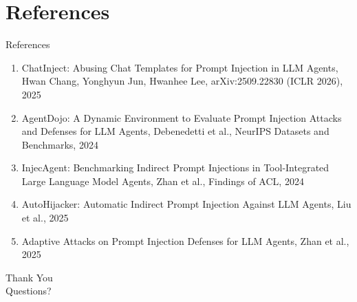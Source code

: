 \documentclass[10pt]{beamer}
\begin{document}
\section{References}
\begin{frame}[allowframebreaks]{References}
  \footnotesize
  \begin{enumerate}
    \item ChatInject: Abusing Chat Templates for Prompt Injection in LLM Agents, Hwan Chang, Yonghyun Jun, Hwanhee Lee, arXiv:2509.22830 (ICLR 2026), 2025
    \item AgentDojo: A Dynamic Environment to Evaluate Prompt Injection Attacks and Defenses for LLM Agents, Debenedetti et al., NeurIPS Datasets and Benchmarks, 2024
    \item InjecAgent: Benchmarking Indirect Prompt Injections in Tool-Integrated Large Language Model Agents, Zhan et al., Findings of ACL, 2024
    \item AutoHijacker: Automatic Indirect Prompt Injection Against LLM Agents, Liu et al., 2025
    \item Adaptive Attacks on Prompt Injection Defenses for LLM Agents, Zhan et al., 2025
  \end{enumerate}
\end{frame}

\begin{frame}[plain]
  \begin{center}
    {\Huge Thank You}\\[1em]
    {\large Questions?}
  \end{center}
\end{frame}
\end{document}
